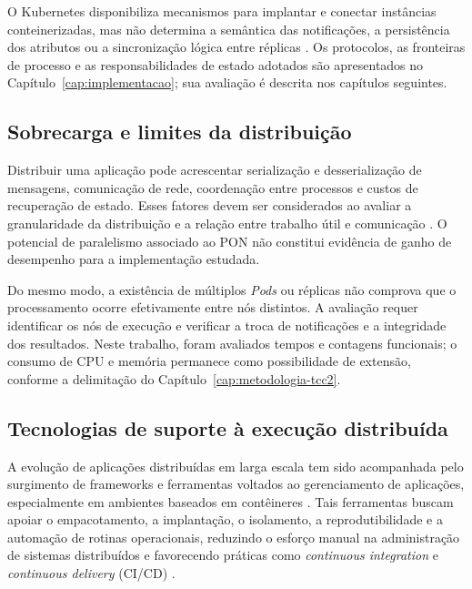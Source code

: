 O Kubernetes disponibiliza mecanismos para implantar e conectar instâncias conteinerizadas, mas não determina a semântica das notificações, a persistência dos atributos ou a sincronização lógica entre réplicas \cite{kubernetes2026documentation}. Os protocolos, as fronteiras de processo e as responsabilidades de estado adotados são apresentados no Capítulo~\ref{cap:implementacao}; sua avaliação é descrita nos capítulos seguintes.

\subsection{Sobrecarga e limites da distribuição}
\label{sec:sobrecarga-distribuicao}

Distribuir uma aplicação pode acrescentar serialização e desserialização de mensagens, comunicação de rede, coordenação entre processos e custos de recuperação de estado. Esses fatores devem ser considerados ao avaliar a granularidade da distribuição e a relação entre trabalho útil e comunicação \cite{tanenbaum2017,burns2019}. O potencial de paralelismo associado ao PON não constitui evidência de ganho de desempenho para a implementação estudada.

Do mesmo modo, a existência de múltiplos \textit{Pods} ou réplicas não comprova que o processamento ocorre efetivamente entre nós distintos. A avaliação requer identificar os nós de execução e verificar a troca de notificações e a integridade dos resultados. Neste trabalho, foram avaliados tempos e contagens funcionais; o consumo de CPU e memória permanece como possibilidade de extensão, conforme a delimitação do Capítulo~\ref{cap:metodologia-tcc2}.

\subsection{Tecnologias de suporte à execução distribuída}

A evolução de aplicações distribuídas em larga escala tem sido acompanhada pelo surgimento de frameworks e ferramentas voltados ao gerenciamento de aplicações, especialmente em ambientes baseados em contêineres \cite{burns2019,kubernetes2026documentation}. Tais ferramentas buscam apoiar o empacotamento, a implantação, o isolamento, a reprodutibilidade e a automação de rotinas operacionais, reduzindo o esforço manual na administração de sistemas distribuídos e favorecendo práticas como \textit{continuous integration} e \textit{continuous delivery} (CI/CD) \cite{burns2019}.

